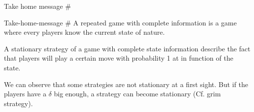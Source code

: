 \begin{frame}{Take home message \#}
    \begin{block}{Take-home-message \#}
        A {\color{green}repeated game with complete information} is a game where every players know the current state of nature.
        
        A {\color{green}stationary strategy} of a game with complete state information describe the fact that players will play a certain move with probability 1 at in function of the state.
        
        We can observe that some strategies are not stationary at a first sight. But if the players have a $\delta$ big enough, a strategy can become stationary (Cf. grim strategy).
    \end{block}

\end{frame}
